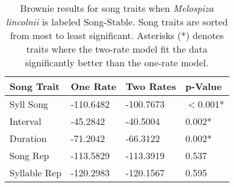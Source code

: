 \documentclass[a4paper,12pt]{article}
\begin{document}
\begin{table}[ht]
\caption{Brownie results for song traits when \textit{Melospiza lincolnii} is labeled Song-Stable. Song traits are sorted from most to least significant. Asterisks (*) denotes traits where the two-rate model fit the data significantly better than the one-rate model.}
\centering
\begin{tabular}{llll}
  \hline
Song Trait & One Rate & Two Rates & p-Value \\ 
  \hline
Syll Song & -110.6482 & -100.7673 & $<$0.001* \\ 
  Interval & -45.2842 & -40.5004 & 0.002* \\ 
  Duration & -71.2042 & -66.3122 & 0.002* \\ 
  Song Rep & -113.5829 & -113.3919 & 0.537 \\ 
  Syllable Rep & -120.2983 & -120.1567 & 0.595 \\ 
   \hline
\end{tabular}
\end{table}
\end{document}

